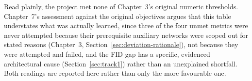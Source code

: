 Read plainly, the project met none of Chapter~3's original numeric thresholds. Chapter~7's assessment against the original objectives argues that this table understates what was actually learned, since three of the four unmet metrics were never attempted because their prerequisite auxiliary networks were scoped out for stated reasons (Chapter~3, Section~\ref{sec:deviation-rationale}), not because they were attempted and failed, and the FID gap has a specific, evidenced architectural cause (Section~\ref{sec:track1}) rather than an unexplained shortfall. Both readings are reported here rather than only the more favourable one.
